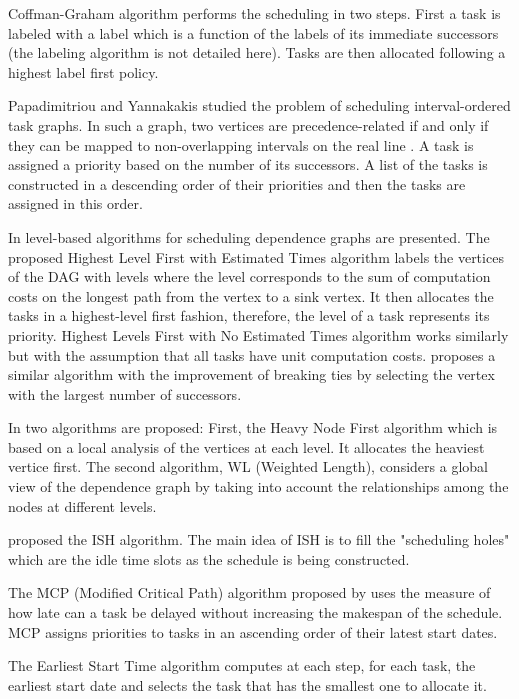 Coffman-Graham algorithm \cite{coffman:1972} performs the scheduling in two steps. First a task is labeled with a label which is a function of the labels of its immediate successors (the labeling algorithm is not detailed here). Tasks are then allocated following a highest label first policy. 

Papadimitriou and Yannakakis \cite{papadimitriou:1979} studied the problem of scheduling interval-ordered task graphs. In such a graph, two vertices are precedence-related if and only if they can be mapped to non-overlapping intervals on the real line \cite{fishburn:1985}. A task is assigned a priority based on the number of its successors. A list of the tasks is constructed in a descending order of their priorities and then the tasks are assigned in this order. 

In \cite{adam:1974} level-based algorithms for scheduling dependence graphs are presented. The proposed Highest Level First with Estimated Times algorithm labels the vertices of the DAG with levels where the level corresponds to the sum of computation costs on the longest path from the vertex to a sink vertex. It then allocates the tasks in a highest-level first fashion, therefore, the level of a task represents its priority. Highest Levels First with No Estimated Times algorithm works similarly but with the assumption that all tasks have unit computation costs. \cite{kasahara:1984} proposes a similar algorithm with the improvement of breaking ties by selecting the vertex with the largest number of successors. 

In \cite{shirazi:1990} two algorithms are proposed: First, the Heavy Node First algorithm which is based on a local analysis of the vertices at each level. It allocates the heaviest vertice first. The second algorithm, WL (Weighted Length), considers a global view of the dependence graph by taking into account the relationships among the nodes at different levels. 

\cite{kruatrachue:1987} proposed the ISH algorithm. The main idea of ISH is to fill the "scheduling holes"  which are the idle time slots as the schedule is being constructed.

The MCP (Modified Critical Path) algorithm proposed by \cite{wu:1990} uses the measure of how late can a task be delayed without increasing the makespan of the schedule. MCP assigns priorities to tasks in an ascending order of their latest start dates. 

The Earliest Start Time algorithm \cite{hwang:1989} computes at each step, for each task, the earliest start date and selects the task that has the smallest one to allocate it. 

